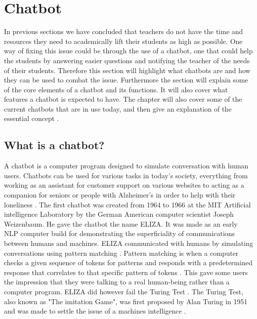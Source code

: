\section{Chatbot}
In previous sections we have concluded that teachers do not have the time and resources they need to academically lift their students as high as possible. One way of fixing this issue could be through the use of a chatbot, one that could help the students by answering easier questions and notifying the teacher of the needs of their students. Therefore this section will highlight what chatbots are and how they can be used to combat the issue. 
\newline\newline
Furthermore the section will explain some of the core elements of a chatbot and its functions. It will also cover what features a chatbot is expected to have.
The chapter will also cover some of the current chatbots that are in use today, and then give an explanation of the essential concept
.

\subsection{What is a chatbot?}
A chatbot is a computer program designed to simulate conversation with human users. Chatbots can be used for various tasks in today's society, everything from working as an assistant for customer support on various websites \cite{OlgaVeretskaya2017WhatAnadea} to acting as a companion for seniors or people with Alzheimer's in order to help with their loneliness \cite{GeorgefomitchevChatBotsEnduranceRobots}.
\newline\newline 
The first chatbot was created from 1964 to 1966 at the MIT Artificial intelligence Laboratory by the German American computer scientist Joseph Weizenbaum. He gave the chatbot the name ELIZA. It was made as an early NLP computer build for demonstrating the superficiality of communications between humans and machines. ELIZA communicated with humans by simulating conversations using pattern matching \cite{ELIZAWikipedia}. Pattern matching is when a computer checks a given sequence of tokens for patterns and responds with a predetermined response that correlates to that specific pattern of tokens \cite{Warth2007OMeta:}. This gave some users the impression that they were talking to a real human-being rather than a computer program. ELIZA did however fail the Turing Test \cite{ELIZAWikipedia}. The Turing Test, also known as "The imitation Game", was first proposed by Alan Turing in 1951 and was made to settle the issue of a machines intelligence \cite{Psych.utorontoArtificialTest}.

